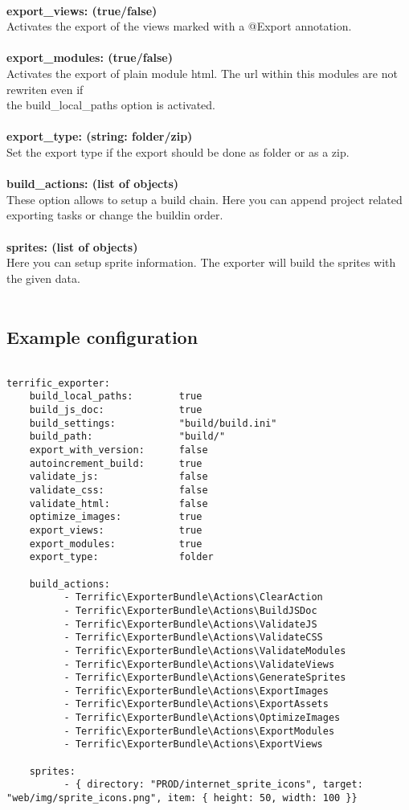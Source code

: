 \\
\textbf{export\_views: (true/false)}\\
Activates the export of the views marked with a @Export annotation.\\
\\
\textbf{export\_modules: (true/false)}\\
Activates the export of plain module html. The url within this modules are not rewriten even if \\the build\_local\_paths option is activated.\\
\\
\textbf{export\_type: (string: folder/zip)}\\
Set the export type if the export should be done as folder or as a zip.\\
\\
\textbf{build\_actions: (list of objects)}\\
These option allows to setup a build chain. Here you can append project related exporting tasks or change the buildin order.\\
\\
\textbf{sprites: (list of objects)}\\
Here you can setup sprite information. The exporter will build the sprites with the given data.\\
\\


\subsection{Example configuration}

\begin{verbatim}

terrific_exporter:
	build_local_paths:        true
	build_js_doc:             true
	build_settings:           "build/build.ini"
	build_path:               "build/"
	export_with_version:      false
	autoincrement_build:      true
	validate_js:              false
	validate_css:             false
	validate_html:            false
	optimize_images:          true
	export_views:             true
	export_modules:           true
	export_type:              folder

	build_actions:
	      - Terrific\ExporterBundle\Actions\ClearAction
	      - Terrific\ExporterBundle\Actions\BuildJSDoc
	      - Terrific\ExporterBundle\Actions\ValidateJS
	      - Terrific\ExporterBundle\Actions\ValidateCSS
	      - Terrific\ExporterBundle\Actions\ValidateModules
	      - Terrific\ExporterBundle\Actions\ValidateViews
	      - Terrific\ExporterBundle\Actions\GenerateSprites
	      - Terrific\ExporterBundle\Actions\ExportImages
	      - Terrific\ExporterBundle\Actions\ExportAssets
	      - Terrific\ExporterBundle\Actions\OptimizeImages
	      - Terrific\ExporterBundle\Actions\ExportModules
	      - Terrific\ExporterBundle\Actions\ExportViews

	sprites:
	      - { directory: "PROD/internet_sprite_icons", target: "web/img/sprite_icons.png", item: { height: 50, width: 100 }}

\end{verbatim}